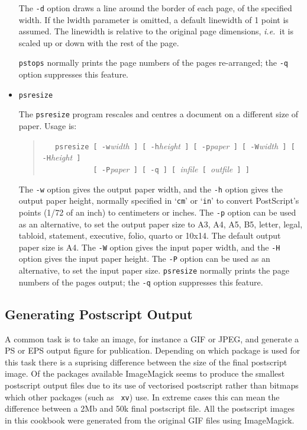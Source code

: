 \documentclass[twoside,11pt]{article}
\newcommand{\htmlref}[2]{#1}
\newcommand{\xlabel}[1]{}
\begin{document}
\begin{itemize}
The {\tt -d} option draws a line around the border of each page, of
the specified width. If the lwidth parameter is omitted, a default
linewidth of 1 point is assumed. The linewidth is relative to the
original page dimensions, {\em i.e.\ }it is scaled up or down with the
rest of the page. 

{\tt pstops} normally prints the page numbers of the pages
re-arranged; the {\tt -q} option suppresses this feature.

\item {\tt psresize}

The {\tt psresize} program rescales and centres a document on a
different size of paper. Usage is:

\begin{quote}
\verb+   psresize [ -w+{\em width}\verb+ ] [ -h+{\em height}\verb+ ] [ -p+{\em paper}\verb+ ] [ -W+{\em width}\verb+ ] [ -H+{\em height}\verb+ ]+\\
\verb+            [ -P+{\em paper}\verb+ ] [ -q ] [ +{\em infile}\verb+ [ +{\em outfile}\verb+ ] ]+ 
\end{quote}

The {\tt -w} option gives the output paper width, and the {\tt -h}
option gives the output paper height, normally specified in `{\tt cm}'
or `{\tt in}' to convert PostScript's points (1/72 of an inch) to
centimeters or inches. The {\tt -p} option can be used as an
alternative, to set the output paper size to A3, A4, A5, B5, letter,
legal, tabloid, statement, executive, folio, quarto or 10x14. The
default output paper size is A4. The {\tt -W} option gives the input
paper width, and the {\tt -H} option gives the input paper height. The
{\tt -P} option can be used as an alternative, to set the input paper
size. {\tt psresize} normally prints the page numbers of the pages
output; the {\tt-q} option suppresses this feature. 

\end{itemize}

\subsection{\xlabel{sc15_ps_generation}Generating Postscript Output\label{sc15_ps_generation}}

A common task is to take an image, for instance a GIF or JPEG, and
generate a PS or EPS output figure for publication. Depending on which
package is used for this task there is a suprising difference between
the size of the final postscript image. Of the packages available
\htmlref{ImageMagick}{sc15_magick} seems to produce the smallest
postscript output files due to its use of vectorised postscript rather
than bitmaps which other packages (such as \htmlref{{\tt
xv}}{sc15_xv}) use. In extreme cases this can mean the difference
between a 2Mb and 50k final postscript file. All the postscript images
in this cookbook were generated from the original GIF files using
ImageMagick.
\end{document}
